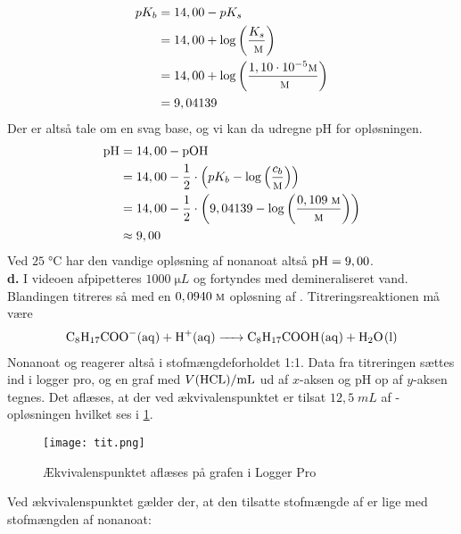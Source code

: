 \documentclass{report}
\begin{document}
\begin{equation*}
\begin{split}
  pK_b&=14,00-pK_s\\
  &=14,00+\log\left(\frac{K_s}{\;\unit{\textsc{m}}}\right) \\
  &=14,00 + \log\left(\frac{1,10 \cdot 10 ^{-5} \unit{\textsc{m}} }{\;\unit{\textsc{m}} }\right) \\
  &=9,04139
\end{split}
\end{equation*}
Der er altså tale om en svag base, og vi kan da udregne pH for opløsningen.
\begin{equation*}
\begin{split}
  \ce{pH} &=14,00 - \ce{pOH} \\
  &=14,00-\frac{1}{2} \cdot \left(pK_b-\log\left(\frac{c_b}{\unit{\textsc{m}} }\right) \right) \\
  &=14,00 - \frac{1}{2} \cdot \left(9,04139 - \log\left(\frac{0,109 \;\unit{\textsc{m}} }{\unit{\textsc{m}}}\right) \right) \\
  &\approx 9,00
\end{split}
\end{equation*}
Ved $25 \;\unit{\celsius} $ har den vandige opløsning af nonanoat altså $\ce{pH} = 9,00$. \\[1ex]
\textbf{d.}
I videoen afpipetteres $1000 \;\unit{\micro L} $ og fortyndes med demineraliseret vand. 
Blandingen titreres så med en $0,0940 \;\unit{\textsc{m}} $ opløsning af .
Titreringsreaktionen må være
\begin{equation}
\begin{split}
  \label{eq:tit}
\ce{C8H17COO-(aq) + H+(aq) -> C8H17COOH(aq) + H2O(l)} 
\end{split}
\end{equation}
Nonanoat og  reagerer altså i stofmængdeforholdet 1:1.
Data fra titreringen sættes ind i logger pro, og en graf med $V(\ce{HCL})/\ce{mL}$ ud af $x$-aksen og pH op af $y$-aksen tegnes.
Det aflæses, at der ved ækvivalenspunktet er tilsat $12,5 \;\unit{mL} $ af -opløsningen hvilket ses i \cref{fig:tit}. 
\begin{figure}[H]
\begin{center}
  \texttt{[image: tit.png]}
\end{center}
\caption{Ækvivalenspunktet aflæses på grafen i Logger Pro}
\label{fig:tit}
\end{figure}
Ved ækvivalenspunktet gælder der, at den tilsatte stofmængde af  er lige med stofmængden af nonanoat:
\end{document}
